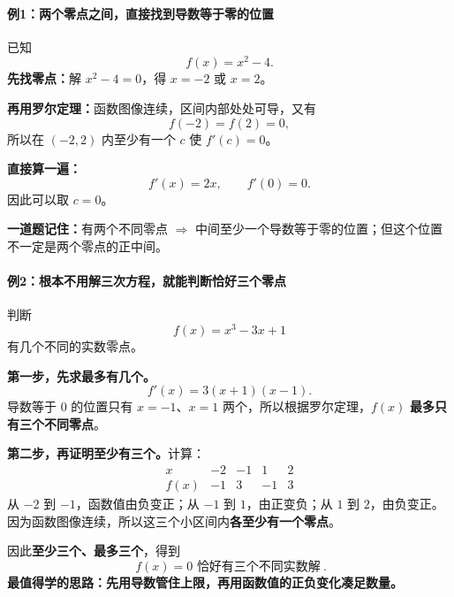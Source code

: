 \clearpage
\begin{examplebox}
\par\medskip
\noindent\begin{minipage}{\linewidth}
\paragraph{例1：两个零点之间，直接找到导数等于零的位置}
\begin{center}\end{center}
\end{minipage}\par\medskip

已知
\[
f(x)=x^2-4.
\]
\textbf{先找零点：}解 $x^2-4=0$，得 $x=-2$ 或 $x=2$。

\textbf{再用罗尔定理：}函数图像连续，区间内部处处可导，又有
\[
f(-2)=f(2)=0,
\]
所以在 $(-2,2)$ 内至少有一个 $c$ 使 $f'(c)=0$。

\textbf{直接算一遍：}
\[
f'(x)=2x,\qquad f'(0)=0.
\]
因此可以取 $c=0$。

\textbf{一道题记住：}有两个不同零点 $\Longrightarrow$ 中间至少一个导数等于零的位置；但这个位置不一定是两个零点的正中间。

\end{examplebox}
\clearpage
\begin{examplebox}
\par\medskip
\noindent\begin{minipage}{\linewidth}
\paragraph{例2：根本不用解三次方程，就能判断恰好三个零点}
\begin{center}\end{center}
\end{minipage}\par\medskip

判断
\[
f(x)=x^3-3x+1
\]
有几个不同的实数零点。

\textbf{第一步，先求最多有几个。}
\[
f'(x)=3(x+1)(x-1).
\]
导数等于 $0$ 的位置只有 $x=-1$、$x=1$ 两个，所以根据罗尔定理，$f(x)$ \textbf{最多只有三个不同零点}。

\textbf{第二步，再证明至少有三个。}计算：
\[
\begin{array}{c|rrrr}
x&-2&-1&1&2\\ \hline
f(x)&-1&3&-1&3
\end{array}
\]
从 $-2$ 到 $-1$，函数值由负变正；从 $-1$ 到 $1$，由正变负；从 $1$ 到 $2$，由负变正。因为函数图像连续，所以这三个小区间内\textbf{各至少有一个零点}。

因此\textbf{至少三个、最多三个}，得到
\[
\boxed{\ f(x)=0\text{ 恰好有三个不同实数解}\ }.
\]
\textbf{最值得学的思路：}\textbf{先用导数管住上限，再用函数值的正负变化凑足数量。}
\end{examplebox}
